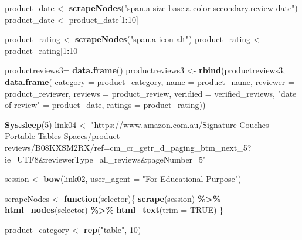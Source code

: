 \documentclass[
]{article}
\newenvironment{Shaded}{\begin{snugshade}}{\end{snugshade}}
\newcommand{\AttributeTok}[1]{\textcolor[rgb]{0.13,0.29,0.53}{#1}}
\newcommand{\ConstantTok}[1]{\textcolor[rgb]{0.56,0.35,0.01}{#1}}
\newcommand{\ControlFlowTok}[1]{\textcolor[rgb]{0.13,0.29,0.53}{\textbf{#1}}}
\newcommand{\DecValTok}[1]{\textcolor[rgb]{0.00,0.00,0.81}{#1}}
\newcommand{\FunctionTok}[1]{\textcolor[rgb]{0.13,0.29,0.53}{\textbf{#1}}}
\newcommand{\NormalTok}[1]{#1}
\newcommand{\OtherTok}[1]{\textcolor[rgb]{0.56,0.35,0.01}{#1}}
\newcommand{\SpecialCharTok}[1]{\textcolor[rgb]{0.81,0.36,0.00}{\textbf{#1}}}
\newcommand{\StringTok}[1]{\textcolor[rgb]{0.31,0.60,0.02}{#1}}
\begin{document}
\begin{Shaded}
\begin{Highlighting}[]
\NormalTok{  product\_date }\OtherTok{\textless{}{-}} \FunctionTok{scrapeNodes}\NormalTok{(}\StringTok{"span.a{-}size{-}base.a{-}color{-}secondary.review{-}date"}\NormalTok{)}
\NormalTok{  product\_date }\OtherTok{\textless{}{-}}\NormalTok{ product\_date[}\DecValTok{1}\SpecialCharTok{:}\DecValTok{10}\NormalTok{]}
  
\NormalTok{  product\_rating }\OtherTok{\textless{}{-}} \FunctionTok{scrapeNodes}\NormalTok{(}\StringTok{"span.a{-}icon{-}alt"}\NormalTok{)}
\NormalTok{  product\_rating }\OtherTok{\textless{}{-}}\NormalTok{ product\_rating[}\DecValTok{1}\SpecialCharTok{:}\DecValTok{10}\NormalTok{]}
  
\NormalTok{  productreviews3}\OtherTok{=} \FunctionTok{data.frame}\NormalTok{()}
\NormalTok{  productreviews3 }\OtherTok{\textless{}{-}} \FunctionTok{rbind}\NormalTok{(productreviews3, }\FunctionTok{data.frame}\NormalTok{(}
                      \AttributeTok{category =}\NormalTok{ product\_category,}
                      \AttributeTok{name =}\NormalTok{ product\_name,}
                      \AttributeTok{reviewer =}\NormalTok{ product\_reviewer,}
                      \AttributeTok{reviews =}\NormalTok{ product\_review,}
                      \AttributeTok{veridied =}\NormalTok{ verified\_reviews,}
                      \StringTok{"date of review"} \OtherTok{=}\NormalTok{ product\_date,}
                      \AttributeTok{ratings =}\NormalTok{ product\_rating))}
  
   \FunctionTok{Sys.sleep}\NormalTok{(}\DecValTok{5}\NormalTok{)}
\NormalTok{link04 }\OtherTok{\textless{}{-}} \StringTok{"https://www.amazon.com.au/Signature{-}Couches{-}Portable{-}Tables{-}Spaces/product{-}reviews/B08KXSM2RX/ref=cm\_cr\_getr\_d\_paging\_btm\_next\_5?ie=UTF8\&reviewerType=all\_reviews\&pageNumber=5"}


\NormalTok{  session }\OtherTok{\textless{}{-}} \FunctionTok{bow}\NormalTok{(link02,}
               \AttributeTok{user\_agent =} \StringTok{"For Educational Purpose"}\NormalTok{)}

\NormalTok{  scrapeNodes }\OtherTok{\textless{}{-}} \ControlFlowTok{function}\NormalTok{(selector)\{}
    \FunctionTok{scrape}\NormalTok{(session) }\SpecialCharTok{\%\textgreater{}\%}
      \FunctionTok{html\_nodes}\NormalTok{(selector) }\SpecialCharTok{\%\textgreater{}\%}
      \FunctionTok{html\_text}\NormalTok{(}\AttributeTok{trim =} \ConstantTok{TRUE}\NormalTok{)}
\NormalTok{  \}}

\NormalTok{  product\_category }\OtherTok{\textless{}{-}} \FunctionTok{rep}\NormalTok{(}\StringTok{"table"}\NormalTok{, }\DecValTok{10}\NormalTok{)}


\end{Highlighting}
\end{Shaded}
\end{document}
